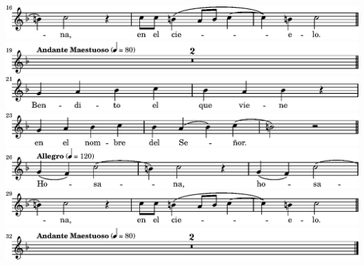\ifx\betweenLilyPondSystem \undefined
  \linebreak
\else
  \expandafter{}%
\fi
\includegraphics{00/lily-ee0cfb43-9}%
\ifx\betweenLilyPondSystem \undefined
  \linebreak
\else
  \expandafter{}%
\fi
\includegraphics{00/lily-ee0cfb43-10}%
\ifx\betweenLilyPondSystem \undefined
  \linebreak
\else
  \expandafter{}%
\fi
\includegraphics{00/lily-ee0cfb43-11}%
\ifx\betweenLilyPondSystem \undefined
  \linebreak
\else
  \expandafter{}%
\fi
\includegraphics{00/lily-ee0cfb43-12}%
\ifx\betweenLilyPondSystem \undefined
  \linebreak
\else
  \expandafter{}%
\fi
\includegraphics{00/lily-ee0cfb43-13}%
\ifx\betweenLilyPondSystem \undefined
  \linebreak
\else
  \expandafter{}%
\fi
\includegraphics{00/lily-ee0cfb43-14}%
\ifx\betweenLilyPondSystem \undefined
  \linebreak
\else
  \expandafter{}%
\fi
\includegraphics{00/lily-ee0cfb43-15}%
